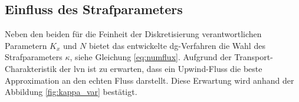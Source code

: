 

\subsection{Einfluss des Strafparameters} \label{sec:kappa_var}
Neben den beiden für die Feinheit der Diskretisierung verantwortlichen Parametern $K_x$ und $N$ bietet das entwickelte \ac{dg}-Verfahren die Wahl des Strafparameters $\kappa$, siehe Gleichung \eqref{eq:numflux}. Aufgrund der Transport-Charakteristik der \ac{lvn} ist zu erwarten, dass ein Upwind-Fluss  die beste Approximation an den echten Fluss darstellt. Diese Erwartung wird anhand der Abbildung \ref{fig:kappa_var} bestätigt.
